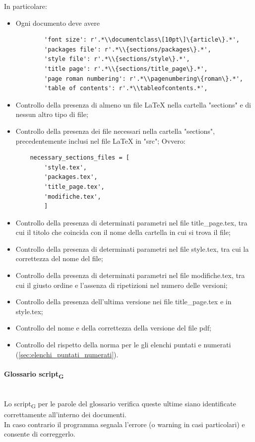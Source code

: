 In particolare:
\begin{itemize}
	\item Ogni documento deve avere 
	\begin{lstlisting}
		'font size': r'.*\\documentclass\[10pt\]\{article\}.*',
		'packages file': r'.*\\{sections/packages\}.*',
		'style file': r'.*\\{sections/style\}.*',
		'title page': r'.*\\{sections/title_page\}.*',
		'page roman numbering': r'.*\\pagenumbering\{roman\}.*',
		'table of contents': r'.*\\tableofcontents.*',
		\end{lstlisting}
		\item Controllo della presenza di almeno un file LaTeX nella cartella "sections" e di nessun altro tipo di file;
		\item Controllo della presenza dei file necessari nella cartella "sections", precedentemente inclusi nel file LaTeX in "src";
	Ovvero:
	\begin{lstlisting}
	necessary_sections_files = [
		'style.tex',
		'packages.tex',
		'title_page.tex',
		'modifiche.tex',
		]
	\end{lstlisting}
	\item Controllo della presenza di determinati parametri nel file title\_page.tex, tra cui il titolo che coincida con il nome della cartella in cui si trova il file;
	\item Controllo della presenza di determinati parametri nel file style.tex, tra cui la correttezza del nome del file;
	\item Controllo della presenza di determinati parametri nel file modifiche.tex, tra cui il giusto ordine e l'assenza di ripetizioni nel numero delle versioni;
	\item Controllo della presenza dell'ultima versione nei file title\_page.tex e in style.tex;
	\item Controllo del nome e della correttezza della versione del file pdf;
	\item Controllo del rispetto della norma per le gli elenchi puntati e numerati (\ref{sec:elenchi_puntati_numerati}).
\end{itemize}

\paragraph{Glossario script\textsubscript{G}}\mbox{}\\
Lo script\textsubscript{G} per le parole del glossario verifica queste ultime siano identificate correttamente all'interno dei documenti.\\
In caso contrario il programma segnala l'errore (o warning in casi particolari) e consente di correggerlo.\\


